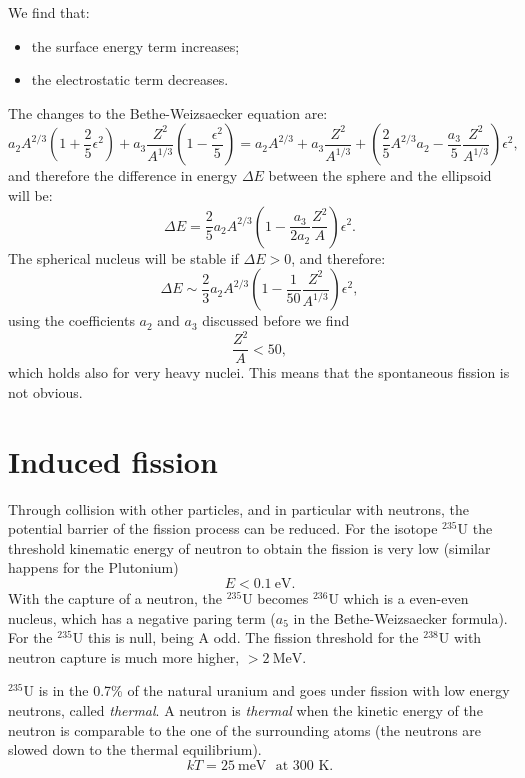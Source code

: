 We find that:
\begin{itemize}
    \item the surface energy term increases;
    \item the electrostatic term decreases.
\end{itemize}
The changes to the Bethe-Weizsaecker equation are:
\begin{equation*}
    a_2A^{2/3}\left(1+\frac{2}{5}\epsilon^2\right)+a_3\frac{Z^2}{A^{1/3}}\left(1-\frac{\epsilon^2}{5}\right) = a_2A^{2/3} + a_3\frac{Z^2}{A^{1/3}} + \left(\frac{2}{5}A^{2/3}a_2 - \frac{a_3}{5}\frac{Z^2}{A^{1/3}}\right) \epsilon^2,
\end{equation*}
and therefore the difference in energy $\Delta E$ between the sphere and the ellipsoid will be:
\begin{equation*}
    \Delta E = \frac{2}{5}a_2A^{2/3}\left(1-\frac{a_3}{2a_2}\frac{Z^2}{A}\right) \epsilon^2.
\end{equation*}
The spherical nucleus will be stable if $\Delta E > 0$, and therefore:
\begin{equation*}
    \Delta E \sim \frac{2}{3}a_2A^{2/3}\left(1-\frac{1}{50}\frac{Z^2}{A^{1/3}}\right)\epsilon^2,
\end{equation*}
using the coefficients $a_2$ and $a_3$ discussed before we find
\begin{equation*}
    \frac{Z^2}{A} < 50,
\end{equation*}
which holds also for very heavy nuclei. This means that the spontaneous fission is not obvious.

\section{Induced fission}
Through collision with other particles, and in particular with neutrons, the potential barrier of the fission process can be reduced. For the isotope $^{235}\mbox{U}$ the threshold kinematic energy of neutron to obtain the fission is very low (similar happens for the Plutonium)
\begin{equation*}
    E < 0.1 ~\mbox{eV}.
\end{equation*}
With the capture of a neutron, the $^{235}\mbox{U}$ becomes $^{236}\mbox{U}$ which is a even-even nucleus, which has a negative paring term ($a_5$ in the Bethe-Weizsaecker formula). For the $^{235}\mbox{U}$ this is null, being A odd. The fission threshold for the $^{238}\mbox{U}$ with neutron capture is much more higher, $> 2 ~\mbox{MeV}$.

$^{235}\mbox{U}$ is in the 0.7\% of the natural uranium and goes under fission with low energy neutrons, called \emph{thermal}. A neutron is \emph{thermal} when the kinetic energy of the neutron is comparable to the one of the surrounding atoms (the neutrons are slowed down to the thermal equilibrium). 
\begin{equation*}
    kT = 25 ~\mbox{meV}\,\,\,\,\mbox{at 300 K}.
\end{equation*}


